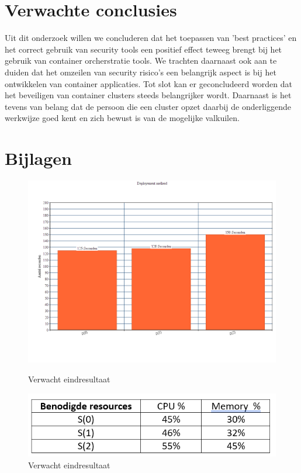 \section{Verwachte conclusies}
\label{sec:verwachte_conclusies}

Uit dit onderzoek willen we concluderen dat het toepassen van 'best practices' en het correct gebruik van security tools een positief effect teweeg brengt bij het gebruik van container orcherstratie tools.
We trachten daarnaast ook aan te duiden dat het omzeilen van security risico's een belangrijk aspect is bij het ontwikkelen van container applicaties. 
Tot slot kan er geconcludeerd worden dat het beveiligen van container clusters steeds belangrijker wordt. Daarnaast is het tevens van belang dat de persoon die een cluster opzet daarbij de onderliggende werkwijze goed kent en zich bewust is van de mogelijke valkuilen.

\section{Bijlagen}
\label{sec:Bijlagen}
\begin{figure}[ht]
	\includegraphics[width=\linewidth]{img/Mock1.png}
	\caption{Verwacht eindresultaat}
	\label{fig:example}
	\includegraphics[width=\linewidth]{img/Mock2.png}
	\caption{Verwacht eindresultaat}
  \label{fig:example}
\end{figure}